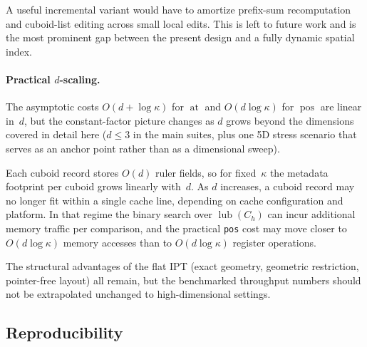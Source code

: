\documentclass[manuscript,screen,review]{acmart}
\theoremstyle{definition}
\theoremstyle{plain}
\begin{document}
A useful incremental variant would have to amortize prefix-sum
recomputation and cuboid-list editing across
small local edits. This is left to future work and is the most
prominent gap between the present design and a fully dynamic spatial
index.

\paragraph{Practical $d$-scaling.}
The asymptotic costs $O(d+\log\kappa)$ for $\operatorname{at}$ and
$O(d\log\kappa)$ for $\operatorname{pos}$ are linear in~$d$, but the
constant-factor picture changes as $d$ grows beyond the dimensions
covered in detail here ($d\le 3$ in the main suites, plus one 5D
stress scenario that serves as an anchor point rather than as a
dimensional sweep).

Each cuboid record stores $O(d)$ ruler fields, so for fixed~$\kappa$
the metadata footprint per cuboid grows linearly
with~$d$. As $d$ increases, a cuboid record may no longer fit within a
single cache line, depending on cache configuration and platform. In
that regime the binary search over $\operatorname{lub}(C_h)$ can incur
additional memory traffic per comparison, and the practical
\texttt{pos} cost may move closer to $O(d\log\kappa)$ memory accesses
than to $O(d\log\kappa)$ register operations.

The structural advantages of the flat IPT (exact geometry,
geometric restriction,
pointer-free layout) all remain, but the benchmarked throughput
numbers should not be extrapolated unchanged to high-dimensional
settings.

\subsection{Reproducibility}
\label{section:reproducibility}
\end{document}
